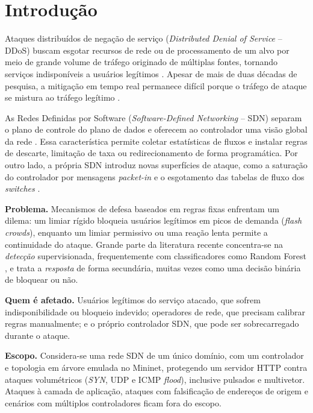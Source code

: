 \documentclass[12pt]{article}
\begin{document}
\section{Introdução}\label{sec:intro}

Ataques distribuídos de negação de serviço (\textit{Distributed Denial of
Service} -- DDoS) buscam esgotar recursos de rede ou de processamento de um
alvo por meio de grande volume de tráfego originado de múltiplas fontes,
tornando serviços indisponíveis a usuários legítimos
\cite{mirkovic2004taxonomy}. Apesar de mais de duas décadas de pesquisa, a
mitigação em tempo real permanece difícil porque o tráfego de ataque se mistura
ao tráfego legítimo \cite{liu2018drl}.

As Redes Definidas por Software (\textit{Software-Defined Networking} -- SDN)
separam o plano de controle do plano de dados e oferecem ao controlador uma
visão global da rede \cite{mckeown2008openflow,kreutz2015sdn}. Essa
característica permite coletar estatísticas de fluxos e instalar regras de
descarte, limitação de taxa ou redirecionamento de forma programática. Por outro
lado, a própria SDN introduz novas superfícies de ataque, como a saturação do
controlador por mensagens \textit{packet-in} e o esgotamento das tabelas de
fluxo dos \textit{switches}
\cite{yan2016sdnddos,albuquerque2023slowtcam}.

\textbf{Problema.} Mecanismos de defesa baseados em regras fixas enfrentam um
dilema: um limiar rígido bloqueia usuários legítimos em picos de demanda
(\textit{flash crowds}), enquanto um limiar permissivo ou uma reação lenta
permite a continuidade do ataque. Grande parte da literatura recente concentra-se
na \emph{detecção} supervisionada, frequentemente com classificadores como
Random Forest \cite{bahashwan2023slr,silva2024sbseg,dias2023microsservicos}, e
trata a \emph{resposta} de forma secundária, muitas vezes como uma decisão
binária de bloquear ou não.

\textbf{Quem é afetado.} Usuários legítimos do serviço atacado, que sofrem
indisponibilidade ou bloqueio indevido; operadores de rede, que precisam
calibrar regras manualmente; e o próprio controlador SDN, que pode ser
sobrecarregado durante o ataque.

\textbf{Escopo.} Considera-se uma rede SDN de um único domínio, com um
controlador e topologia em árvore emulada no Mininet, protegendo um servidor
HTTP contra ataques volumétricos (\textit{SYN}, UDP e ICMP \textit{flood}),
inclusive pulsados e multivetor. Ataques à camada de aplicação, ataques com
falsificação de endereços de origem e cenários com múltiplos controladores
ficam fora do escopo.
\end{document}

